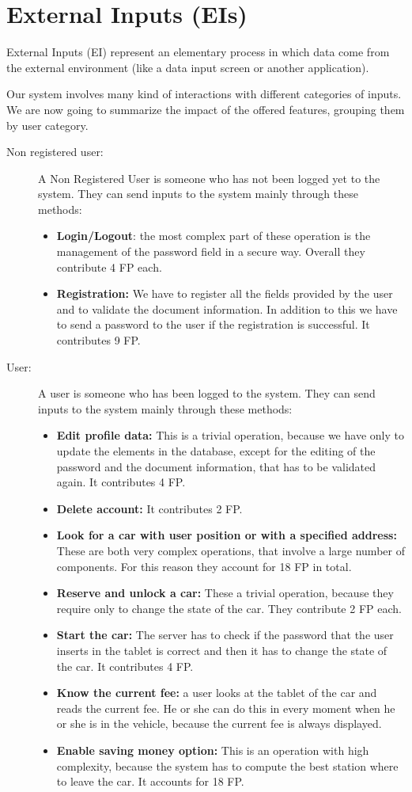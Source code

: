 \section{External Inputs (EIs)}
External Inputs (EI) represent an elementary process in which data come from the external environment (like a data input screen or another application).

Our system involves many kind of interactions with different categories of inputs.
We are now going to summarize the impact of the offered features, grouping them by user category.

\begin{description}
	\item[Non registered user:] A Non Registered User is someone who has not been logged yet to the system. They can send inputs to the system mainly through these methods: 
	\begin{itemize}
	\item \textbf{Login/Logout}: the most complex part of these operation is the management of the password field in a secure way. Overall they contribute 4 FP each.
	\item \textbf{Registration:} We have to register all the fields provided by the user and to validate the document information. In addition to this we have to send a password to the user if the registration is successful. It contributes 9 FP.
	\end{itemize}
	
	\item[User:] A user is someone who has been logged to the system. They can send inputs to the system mainly through these methods: 
	\begin{itemize}
	\item\textbf{Edit profile data:} This is a trivial operation, because we have only to update the elements in the database, except for the editing of the password and the document information, that has to be validated again. It contributes 4 FP.
	\item\textbf{Delete account:} It contributes 2 FP.
	\item\textbf{Look for a car with user position or with a specified address:} These are both very complex operations, that involve a large number of components. For this reason they account for 18 FP in total.
	\item\textbf{Reserve and unlock a car:} These a trivial operation, because they require only to change the state of the car. They contribute 2 FP each.
	\item\textbf{Start the car:} The server has to check if the password that the user inserts in the tablet is correct and then it has to change the state of the car. It contributes 4 FP.
	\item\textbf{Know the current fee:} a user looks at the tablet of the car and reads the current fee. He or she can do this in every moment when he or she is in the vehicle, because the current fee is always displayed.
	\item\textbf{Enable saving money option:} This is an operation with high complexity, because the system has to compute the best station where to leave the car. It accounts for 18 FP.
	\end{itemize}
	

\end{description}
